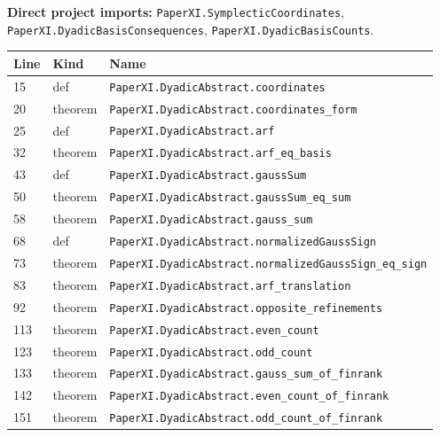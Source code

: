 \documentclass[10pt,oneside]{book}
\begin{document}

\textbf{Direct project imports:} \nolinkurl{PaperXI.SymplecticCoordinates}, \nolinkurl{PaperXI.DyadicBasisConsequences}, \nolinkurl{PaperXI.DyadicBasisCounts}.

\begin{longtable}{@{}p{}p{}p{}@{}}\toprule Line&Kind&Name\\\midrule\endhead

15&def&\nolinkurl{PaperXI.DyadicAbstract.coordinates}\\

20&theorem&\nolinkurl{PaperXI.DyadicAbstract.coordinates_form}\\

25&def&\nolinkurl{PaperXI.DyadicAbstract.arf}\\

32&theorem&\nolinkurl{PaperXI.DyadicAbstract.arf_eq_basis}\\

43&def&\nolinkurl{PaperXI.DyadicAbstract.gaussSum}\\

50&theorem&\nolinkurl{PaperXI.DyadicAbstract.gaussSum_eq_sum}\\

58&theorem&\nolinkurl{PaperXI.DyadicAbstract.gauss_sum}\\

68&def&\nolinkurl{PaperXI.DyadicAbstract.normalizedGaussSign}\\

73&theorem&\nolinkurl{PaperXI.DyadicAbstract.normalizedGaussSign_eq_sign}\\

83&theorem&\nolinkurl{PaperXI.DyadicAbstract.arf_translation}\\

92&theorem&\nolinkurl{PaperXI.DyadicAbstract.opposite_refinements}\\

113&theorem&\nolinkurl{PaperXI.DyadicAbstract.even_count}\\

123&theorem&\nolinkurl{PaperXI.DyadicAbstract.odd_count}\\

133&theorem&\nolinkurl{PaperXI.DyadicAbstract.gauss_sum_of_finrank}\\

142&theorem&\nolinkurl{PaperXI.DyadicAbstract.even_count_of_finrank}\\

151&theorem&\nolinkurl{PaperXI.DyadicAbstract.odd_count_of_finrank}\\

\bottomrule\end{longtable}
\end{document}
